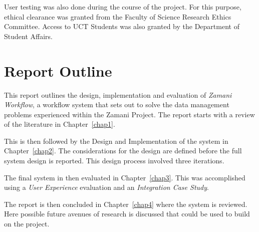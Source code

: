     User testing was also done during the course of the project. For
    this purpose, ethical clearance was granted from the Faculty of
    Science Research Ethics Committee. Access to UCT Students was also
    granted by the Department of Student Affairs.

\section{Report Outline}
    This report outlines the design, implementation and evaluation
    of \emph{Zamani Workflow}, a workflow system that sets out to
    solve the data management problems experienced within the
    Zamani Project. The report starts with a review of the literature in
    Chapter~\ref{chap1}.

    This is then followed by the Design and Implementation of the system
    in Chapter~\ref{chap2}. The considerations for the design are defined
    before the full system design is reported. This design process involved
    three iterations.

    The final system in then evaluated in Chapter~\ref{chap3}. This was accomplished
    using a \emph{User Experience} evaluation and an \emph{Integration Case Study}.

    The report is then concluded in Chapter~\ref{chap4} where the system is
    reviewed. Here possible future avenues of research is discussed that could
    be used to build on the project.
